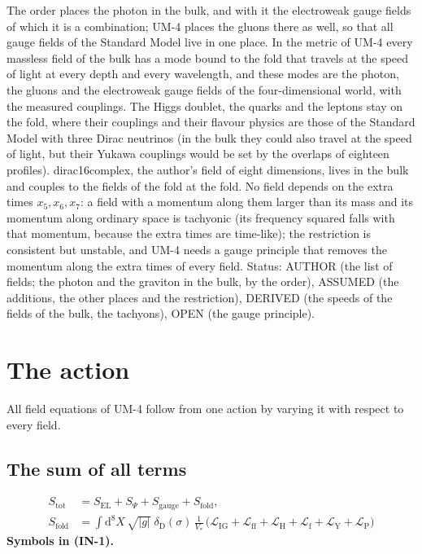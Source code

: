 \documentclass[
  10pt,
]{article}
\begin{document}
The order places the photon in the bulk, and with it the electroweak
gauge fields of which it is a combination; UM-4 places the gluons there
as well, so that all gauge fields of the Standard Model live in one
place. In the metric of UM-4 every massless field of the bulk has a mode
bound to the fold that travels at the speed of light at every depth and
every wavelength, and these modes are the photon, the gluons and the
electroweak gauge fields of the four-dimensional world, with the
measured couplings. The Higgs doublet, the quarks and the leptons stay
on the fold, where their couplings and their flavour physics are those
of the Standard Model with three Dirac neutrinos (in the bulk they could
also travel at the speed of light, but their Yukawa couplings would be
set by the overlaps of eighteen profiles). dirac16complex, the author's
field of eight dimensions, lives in the bulk and couples to the fields
of the fold at the fold. No field depends on the extra times
\(x_5, x_6, x_7\): a field with a momentum along them larger than its
mass and its momentum along ordinary space is tachyonic (its frequency
squared falls with that momentum, because the extra times are
time-like); the restriction is consistent but unstable, and UM-4 needs a
gauge principle that removes the momentum along the extra times of every
field. Status: AUTHOR (the list of fields; the photon and the graviton
in the bulk, by the order), ASSUMED (the additions, the other places and
the restriction), DERIVED (the speeds of the fields of the bulk, the
tachyons), OPEN (the gauge principle).

\hypertarget{the-action}{%
\section{The action}\label{the-action}}

All field equations of UM-4 follow from one action by varying it with
respect to every field.

\hypertarget{the-sum-of-all-terms}{%
\subsection{The sum of all terms}\label{the-sum-of-all-terms}}

\[
\begin{aligned}
S_{\mathrm{tot}} &= S_{\mathrm{EL}} + S_\Psi + S_{\mathrm{gauge}} + S_{\mathrm{fold}},\\
S_{\mathrm{fold}} &= \int\mathrm{d}^8X\,\sqrt{\lvert g\rvert}\;\delta_{\mathrm{D}}(\sigma)\,\frac{1}{V_*}\,
\big(\mathcal{L}_{\mathrm{IG}} + \mathcal{L}_{\mathrm{ff}} + \mathcal{L}_{\mathrm{H}} + \mathcal{L}_{\mathrm{f}}
+ \mathcal{L}_{\mathrm{Y}} + \mathcal{L}_{\mathrm{P}}\big)
\end{aligned} \tag{IN-1}
\] \textbf{Symbols in (IN-1).}
\end{document}
